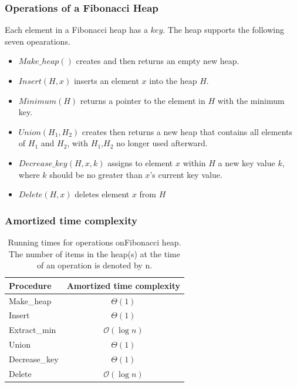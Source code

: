 \documentclass[catalog.tex]{subfiles}
\begin{document}
\subsubsection*{Operations of a Fibonacci Heap}
Each element in a Fibonacci heap has a $key$. The heap supports the following seven opearations. ~\cite{intro3rd}
\begin{itemize}
	\item $Make\_heap()$ creates and then returns an empty new heap. \item $Insert(H,x)$ inserts an element $x$ into the heap $H$.
	\item $Minimum(H)$ returns a pointer to the element in $H$ with the minimum key.
	\item $Union(H_1,H_2)$ creates then returns a new heap that contains all elements of $H_1$ and $H_2$, with $H_1$,$H_2$ no longer used afterward.
	\item $Decrease\_key(H,x,k)$ assigns to element $x$ within $H$ a new key value $k$, where $k$ should be no greater than $x$'s current key value.
	\item $Delete(H,x)$ deletes element $x$ from $H$
\end{itemize}
\subsubsection*{Amortized time complexity}
\begin{table}[h]
	\centering
	\begin{tabular}{lc}
	Procedure     & Amortized time complexity \\ \hline
	Make\_heap    &   $\Theta(1)$                        \\
	Insert        &   $\Theta(1)$                        \\
	Extract\_min  &   $\mathcal{O}(\log n) $             \\
	Union         &   $\Theta(1)$                        \\
	Decrease\_key &   $\Theta(1)$                        \\
	Delete        &   $\mathcal{O}(\log n) $                      
	\end{tabular}
	\caption{Running times for operations onFibonacci heap. The number
	of items in the heap(s) at the time of an operation is denoted by n.}
	\label{tab:my-table}
	\end{table}
\end{document}
